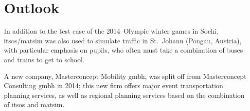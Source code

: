 \section{Outlook}
In addition to the test case of the 2014~Olympic winter games in Sochi, \gls{itsos}/\gls{matsim}
was also used to simulate traffic in St.\ Johann (Pongau, Austria), with particular 
emphasis on pupils, who often must take a combination of buses and trains to
get to school.

A new company, Masterconcept Mobility \gls{gmbh}, was split off from Masterconcept Consulting \gls{gmbh} in 2014; 
this new firm offers major event transportation planning services, as well as regional planning services 
based on the combination of \gls{itsos} and \gls{matsim}.

